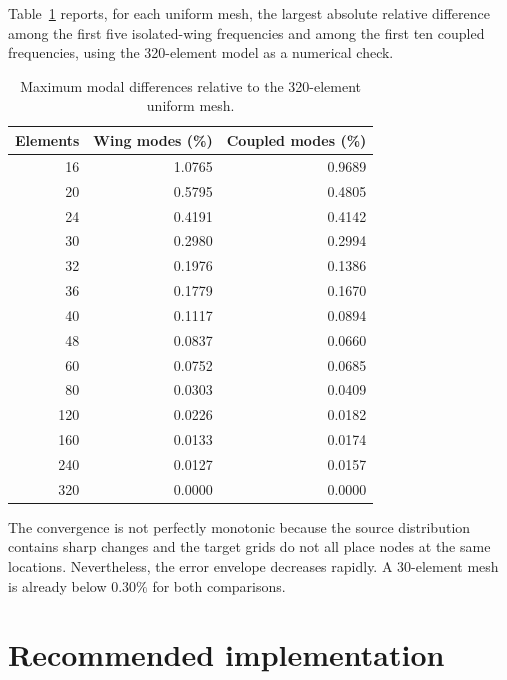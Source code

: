 \documentclass[11pt,a4paper]{article}
\begin{document}
Table~\ref{tab:convergence} reports, for each uniform mesh, the largest
absolute relative difference among the first five isolated-wing frequencies
and among the first ten coupled frequencies, using the 320-element model as a
numerical check.

\begin{table}[htbp]
\centering
\caption{Maximum modal differences relative to the 320-element uniform mesh.}
\label{tab:convergence}
\begin{tabular}{rrr}
\toprule
Elements & Wing modes (\%) & Coupled modes (\%)\\
\midrule
16  & 1.0765 & 0.9689\\
20  & 0.5795 & 0.4805\\
24  & 0.4191 & 0.4142\\
30  & 0.2980 & 0.2994\\
32  & 0.1976 & 0.1386\\
36  & 0.1779 & 0.1670\\
40  & 0.1117 & 0.0894\\
48  & 0.0837 & 0.0660\\
60  & 0.0752 & 0.0685\\
80  & 0.0303 & 0.0409\\
120 & 0.0226 & 0.0182\\
160 & 0.0133 & 0.0174\\
240 & 0.0127 & 0.0157\\
320 & 0.0000 & 0.0000\\
\bottomrule
\end{tabular}
\end{table}

The convergence is not perfectly monotonic because the source distribution
contains sharp changes and the target grids do not all place nodes at the
same locations.  Nevertheless, the error envelope decreases rapidly.  A
30-element mesh is already below \(0.30\%\) for both comparisons.

\section{Recommended implementation}
\end{document}
